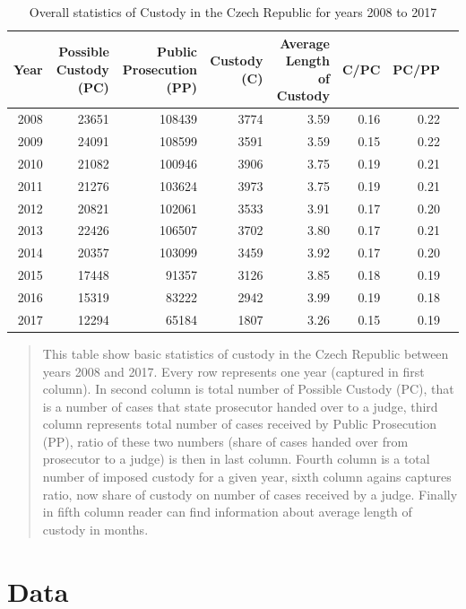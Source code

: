 \documentclass[12pt, twoside,openany]{book} %
\begin{document}
\newpage

\begin{table}
\centering
\begin{tabular}{rrrrrrrr}
  \hline
 Year & Possible Custody (PC) & Public Prosecution (PP) & Custody (C) & Average Length of Custody & C/PC & PC/PP \\ 
  \hline
 2008 & 23651 & 108439 & 3774 & 3.59 & 0.16 & 0.22 \\ 
   2009 & 24091 & 108599 & 3591 & 3.59 & 0.15 & 0.22 \\ 
   2010 & 21082 & 100946 & 3906 & 3.75 & 0.19 & 0.21 \\ 
   2011 & 21276 & 103624 & 3973 & 3.75 & 0.19 & 0.21 \\ 
  2012 & 20821 & 102061 & 3533 & 3.91 & 0.17 & 0.20 \\ 
   2013 & 22426 & 106507 & 3702 & 3.80 & 0.17 & 0.21 \\ 
   2014 & 20357 & 103099 & 3459 & 3.92 & 0.17 & 0.20 \\ 
   2015 & 17448 & 91357 & 3126 & 3.85 & 0.18 & 0.19 \\ 
  2016 & 15319 & 83222 & 2942 & 3.99 & 0.19 & 0.18 \\ 
   2017 & 12294 & 65184 & 1807 & 3.26 & 0.15 & 0.19 \\ 
   \hline
\end{tabular}
  \caption{Overall statistics of Custody in the Czech Republic for years 2008 to 2017 }

 \medskip
{\small 
\begin{quotation}
This table show basic statistics of custody in the Czech Republic between years 2008 and 2017. Every row represents one year (captured in first column). In second column is total number of Possible Custody (PC), that is a number of cases that state prosecutor handed over to a judge, third column represents total number of cases received by Public Prosecution (PP), ratio of these two numbers (share of cases handed over from prosecutor to a judge) is then in last column. Fourth column is a total number of imposed custody for a given year, sixth column agains captures ratio, now share of custody on number of cases received by a judge. Finally in fifth column reader can find information about average length of custody in months.
\end{quotation}
}
\end{table}






\section{Data}     %
\end{document}

